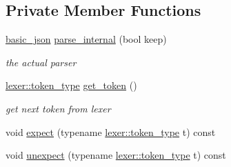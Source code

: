 \subsection*{Private Member Functions}
\begin{DoxyCompactItemize}
\item 
\hyperlink{classnlohmann_1_1basic__json}{basic\+\_\+json} \hyperlink{classnlohmann_1_1basic__json_1_1parser_a86e95a2b7b47c89135c41295949bcf0a}{parse\+\_\+internal} (bool keep)
\begin{DoxyCompactList}\small\item\em the actual parser \end{DoxyCompactList}\item 
\hyperlink{classnlohmann_1_1basic__json_1_1lexer_a96887d6cd131e3d3a85a9d71fbdbcdf7}{lexer\+::token\+\_\+type} \hyperlink{classnlohmann_1_1basic__json_1_1parser_ab00b85e650dc89c39ae02539ec5f41d4}{get\+\_\+token} ()
\begin{DoxyCompactList}\small\item\em get next token from lexer \end{DoxyCompactList}\item 
void \hyperlink{classnlohmann_1_1basic__json_1_1parser_aa0403d27b84db70cc5ea0ab8fd4509af}{expect} (typename \hyperlink{classnlohmann_1_1basic__json_1_1lexer_a96887d6cd131e3d3a85a9d71fbdbcdf7}{lexer\+::token\+\_\+type} t) const
\item 
void \hyperlink{classnlohmann_1_1basic__json_1_1parser_a08e23e71af8623c8371c251480071f73}{unexpect} (typename \hyperlink{classnlohmann_1_1basic__json_1_1lexer_a96887d6cd131e3d3a85a9d71fbdbcdf7}{lexer\+::token\+\_\+type} t) const
\end{DoxyCompactItemize}
